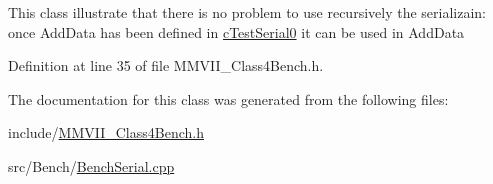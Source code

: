 This class illustrate that there is no problem to use recursively the serializain\+: once Add\+Data has been defined in \hyperlink{classMMVII_1_1cTestSerial0}{c\+Test\+Serial0} it can be used in Add\+Data 

Definition at line 35 of file M\+M\+V\+I\+I\+\_\+\+Class4\+Bench.\+h.



The documentation for this class was generated from the following files\+:\begin{DoxyCompactItemize}
\item 
include/\hyperlink{MMVII__Class4Bench_8h}{M\+M\+V\+I\+I\+\_\+\+Class4\+Bench.\+h}\item 
src/\+Bench/\hyperlink{BenchSerial_8cpp}{Bench\+Serial.\+cpp}\end{DoxyCompactItemize}
